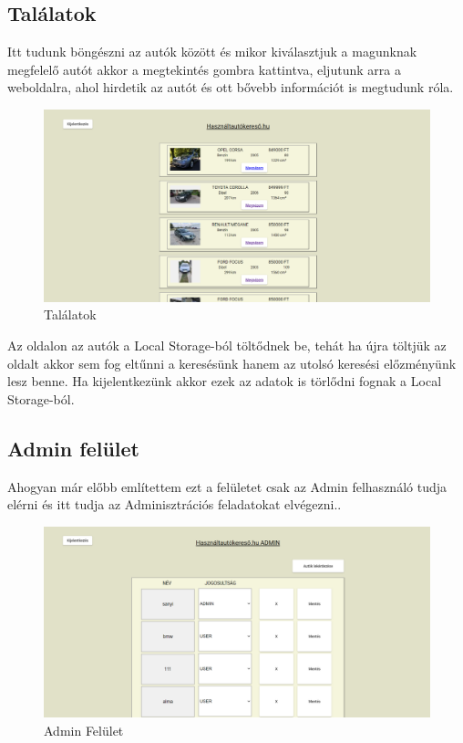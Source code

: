 \subsection{Találatok}

Itt tudunk böngészni az autók között és mikor kiválasztjuk a magunknak megfelelő autót akkor a megtekintés gombra kattintva, eljutunk arra a weboldalra, ahol hirdetik az autót és ott bővebb információt is megtudunk róla.

\begin{figure}[h]
\centering
\includegraphics[scale=0.9]{images/Talalatok_FE.png}
\caption{Találatok}
\label{fig:Találatok}
\end{figure}

Az oldalon az autók a Local Storage-ból töltődnek be, tehát ha újra töltjük az oldalt akkor sem fog eltűnni a keresésünk hanem az utolsó keresési előzményünk lesz benne. Ha kijelentkezünk akkor ezek az adatok is törlődni fognak a Local Storage-ból.
\newpage

\subsection{Admin felület}

Ahogyan már előbb említettem ezt a felületet csak az Admin felhasználó tudja elérni és itt tudja az Adminisztrációs feladatokat elvégezni..

\begin{figure}[h]
\centering
\includegraphics[scale=0.9]{images/Admin_FE.png}
\caption{Admin Felület}
\label{fig:Admin}
\end{figure}

